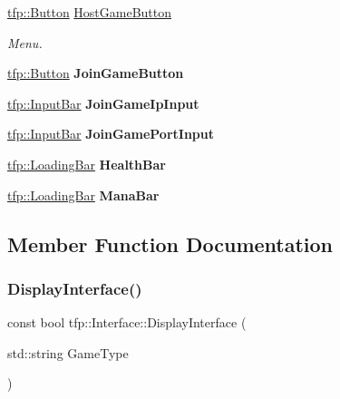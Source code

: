 \begin{DoxyCompactItemize}
\item 
\mbox{\label{classtfp_1_1_interface_a66f277cd3ea46cb7021ae4646791413f}} 
\mbox{\hyperlink{classtfp_1_1_button}{tfp\+::\+Button}} \mbox{\hyperlink{classtfp_1_1_interface_a66f277cd3ea46cb7021ae4646791413f}{Host\+Game\+Button}}
\begin{DoxyCompactList}\small\item\em Menu. \end{DoxyCompactList}\item 
\mbox{\label{classtfp_1_1_interface_a14a34cab4da268ad54da14ebf190b410}} 
\mbox{\hyperlink{classtfp_1_1_button}{tfp\+::\+Button}} {\bfseries Join\+Game\+Button}
\item 
\mbox{\label{classtfp_1_1_interface_aa68db6613f128c354756168517efd71f}} 
\mbox{\hyperlink{classtfp_1_1_input_bar}{tfp\+::\+Input\+Bar}} {\bfseries Join\+Game\+Ip\+Input}
\item 
\mbox{\label{classtfp_1_1_interface_af5004936649b8b52cc68c0ba8ce8d157}} 
\mbox{\hyperlink{classtfp_1_1_input_bar}{tfp\+::\+Input\+Bar}} {\bfseries Join\+Game\+Port\+Input}
\item 
\mbox{\label{classtfp_1_1_interface_aa31f0739f5e65e17b142f69fcb6627b3}} 
\mbox{\hyperlink{classtfp_1_1_loading_bar}{tfp\+::\+Loading\+Bar}} {\bfseries Health\+Bar}
\item 
\mbox{\label{classtfp_1_1_interface_a322eb0f1a114afed79957e9d1a28fa7a}} 
\mbox{\hyperlink{classtfp_1_1_loading_bar}{tfp\+::\+Loading\+Bar}} {\bfseries Mana\+Bar}
\end{DoxyCompactItemize}


\subsection{Member Function Documentation}
\mbox{\label{classtfp_1_1_interface_ac6a62168a84c0a58f90f457b981cb6b9}} 
\subsubsection{\texorpdfstring{Display\+Interface()}{DisplayInterface()}}
{\footnotesize\ttfamily const bool tfp\+::\+Interface\+::\+Display\+Interface (\begin{DoxyParamCaption}\item[{std\+::string}]{Game\+Type }\end{DoxyParamCaption})}



